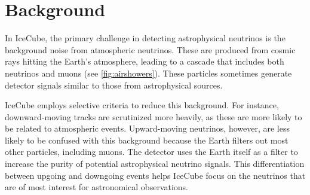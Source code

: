 \section{Background}

In IceCube, the primary challenge in detecting astrophysical neutrinos is the background noise from atmospheric neutrinos.
These are produced from cosmic rays hitting the Earth's atmosphere, leading to a cascade that includes both neutrinos and muons (see \cref{fig:airshowers}).
These particles sometimes generate detector signals similar to those from astrophysical sources.

IceCube employs selective criteria to reduce this background.
For instance, downward-moving tracks are scrutinized more heavily, as these are more likely to be related to atmospheric events.
Upward-moving neutrinos, however, are less likely to be confused with this background because the Earth filters out most other particles, including muons.
The detector uses the Earth itself as a filter to increase the purity of potential astrophysical neutrino signals.
This differentiation between upgoing and downgoing events helps IceCube focus on the neutrinos that are of most interest for astronomical observations.